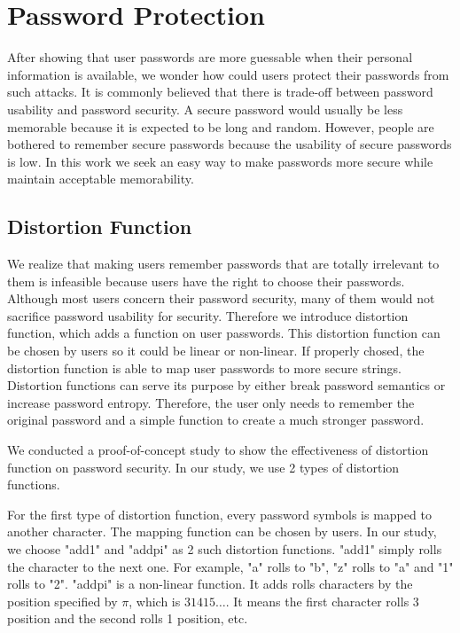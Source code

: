 \section{Password Protection}
\label{passwordprotection}
After showing that user passwords are more guessable when their personal information is available, we wonder how could users protect their passwords from such attacks. It is commonly believed that there is trade-off between password usability and password security. A secure password would usually be less memorable because it is expected to be long and random. However, people are bothered to remember secure passwords because the usability of secure passwords is low. In this work we seek an easy way to make passwords more secure while maintain acceptable memorability.

\subsection{Distortion Function}
We realize that making users remember passwords that are totally irrelevant to them is infeasible because users have the right to choose their passwords. Although most users concern their password security, many of them would not sacrifice password usability for security. Therefore we introduce distortion function, which adds a function on user passwords. This distortion function can be chosen by users so it could be linear or non-linear. If properly chosed, the distortion function is able to map user passwords to more secure strings. Distortion functions can serve its purpose by either break password semantics or increase password entropy. Therefore, the user only needs to remember the original password and a simple function to create a much stronger password. 

We conducted a proof-of-concept study to show the effectiveness of distortion function on password security. In our study, we use 2 types of distortion functions. 

For the first type of distortion function, every password symbols is mapped to another character. The mapping function can be chosen by users. In our study, we choose "add1" and "addpi" as 2 such distortion functions. "add1" simply rolls the character to the next one. For example, "a" rolls to "b", "z" rolls to "a" and "1" rolls to "2". "addpi" is a non-linear function. It adds rolls characters by the position specified by $\pi$, which is $31415 \ldots$. It means the first character rolls 3 position and the second rolls 1 position, etc.

